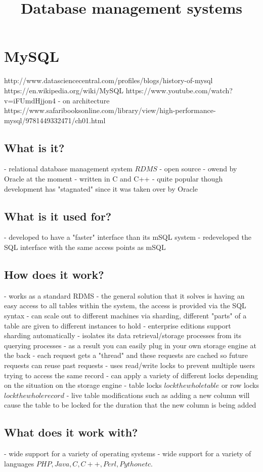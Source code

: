 \title{Database management systems}

\chapter{MySQL}
http://www.datasciencecentral.com/profiles/blogs/history-of-mysql
https://en.wikipedia.org/wiki/MySQL
https://www.youtube.com/watch?v=iFUmdHjjon4
- on architecture
https://www.safaribooksonline.com/library/view/high-performance-mysql/9781449332471/ch01.html

\section{What is it?}
- relational database management system \(RDMS\)
- open source
- owend by Oracle at the moment
- written in C and C++
- quite popular though development has "stagnated" since it was taken over by Oracle

\section{What is it used for?}
- developed to have a "faster" interface than its mSQL system
- redeveloped the SQL interface with the same access points as mSQL

\section{How does it work?}
- works as a standard RDMS
- the general solution that it solves is having an easy access to all tables within the system, the access is provided via the SQL syntax
- can scale out to different machines via sharding, different "parts" of a table are given to different instances to hold - enterprise editions support sharding automatically
- isolates its data retrieval/storage processes from its querying processes - as a result you can easily plug in your own storage engine at the back
- each request gets a "thread" and these requests are cached so future requests can reuse past requests
- uses read/write locks to prevent multiple users trying to access the same record
- can apply a variety of different locks depending on the situation on the storage engine - table locks \(lock the whole table\) or row locks \(lock the whole record\)
- live table modifications such as adding a new column will cause the table to be locked for the duration that the new column is being added

\section{What does it work with?}
- wide support for a variety of operating systems
- wide support for a variety of languages \(PHP, Java, C, C++, Perl, Python etc.\)

